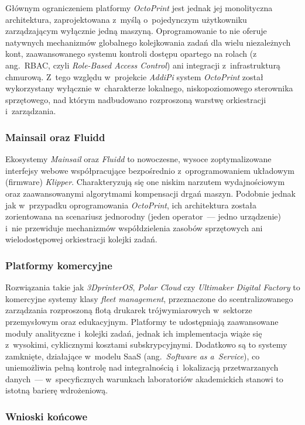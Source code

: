 \documentclass[a4paper,12pt,reqno]{article}
\begin{document}
Głównym ograniczeniem platformy \textit{OctoPrint} jest jednak jej monolityczna architektura, zaprojektowana z~myślą o~pojedynczym użytkowniku zarządzającym wyłącznie jedną maszyną. Oprogramowanie to nie oferuje natywnych mechanizmów globalnego kolejkowania zadań dla wielu niezależnych kont, zaawansowanego systemu kontroli dostępu opartego na rolach (z ang.~RBAC, czyli \textit{Role-Based Access Control}) ani integracji z~infrastrukturą chmurową. Z~tego względu w~projekcie \textit{AddiPi} system \textit{OctoPrint} został wykorzystany wyłącznie w~charakterze lokalnego, niskopoziomowego sterownika sprzętowego, nad którym nadbudowano rozproszoną warstwę orkiestracji i~zarządzania.

\subsubsection{Mainsail oraz Fluidd}

Ekosystemy \textit{Mainsail} oraz \textit{Fluidd} to nowoczesne, wysoce zoptymalizowane interfejsy webowe współpracujące bezpośrednio z~oprogramowaniem układowym (firmware) \textit{Klipper}. Charakteryzują się one niskim narzutem wydajnościowym oraz zaawansowanymi algorytmami kompensacji drgań maszyn. Podobnie jednak jak w~przypadku oprogramowania \textit{OctoPrint}, ich architektura została zorientowana na scenariusz jednorodny (jeden operator~--- jedno urządzenie) i~nie przewiduje mechanizmów współdzielenia zasobów sprzętowych ani wielodostępowej orkiestracji kolejki zadań.

\subsubsection{Platformy komercyjne}

Rozwiązania takie jak \textit{3DprinterOS}, \textit{Polar Cloud} czy \textit{Ultimaker Digital Factory} to komercyjne systemy klasy \textit{fleet management}, przeznaczone do scentralizowanego zarządzania rozproszoną flotą drukarek trójwymiarowych w~sektorze przemysłowym oraz edukacyjnym. Platformy te udostępniają zaawansowane moduły analityczne i~kolejki zadań, jednak ich implementacja wiąże się z~wysokimi, cyklicznymi kosztami subskrypcyjnymi. Dodatkowo są to systemy zamknięte, działające w~modelu SaaS (ang.~\textit{Software as a~Service}), co uniemożliwia pełną kontrolę nad integralnością i~lokalizacją przetwarzanych danych~--- w~specyficznych warunkach laboratoriów akademickich stanowi to istotną barierę wdrożeniową.

\subsubsection{Wnioski końcowe}
\end{document}
